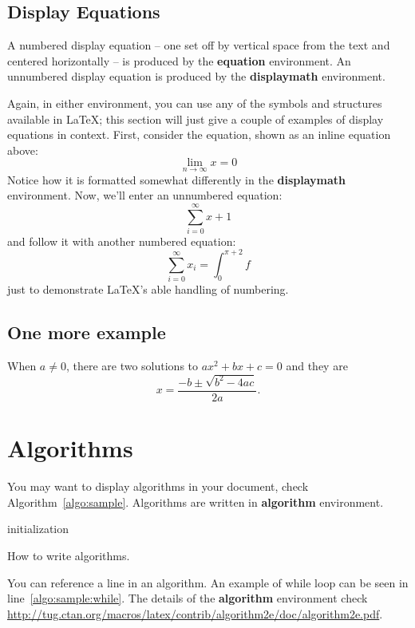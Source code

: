 \documentclass[article,slovene]{stucosrec}
\newcommand{\latex}{\LaTeX\xspace}
\begin{document}
	\subsection{Display Equations}
	A numbered display equation -- one set off by vertical space
	from the text and centered horizontally -- is produced
	by the \textbf{equation} environment. An unnumbered display
	equation is produced by the \textbf{displaymath} environment.
	
	Again, in either environment, you can use any of the symbols
	and structures available in \LaTeX; this section will just
	give a couple of examples of display equations in context.
	First, consider the equation, shown as an inline equation above:
	\begin{equation}\lim_{n\rightarrow \infty}x=0\end{equation}
	Notice how it is formatted somewhat differently in
	the \textbf{displaymath}
	environment.  Now, we'll enter an unnumbered equation:
	\begin{displaymath}\sum_{i=0}^{\infty} x + 1\end{displaymath}
	and follow it with another numbered equation:
	\begin{equation}\sum_{i=0}^{\infty}x_i=\int_{0}^{\pi+2} f\end{equation}
	just to demonstrate \LaTeX's able handling of numbering.
	
	\subsection{One more example}
	When $a \ne 0$, there are two solutions to $ax^2 + bx + c = 0$ and they are
	$$x = \frac{-b \pm \sqrt{b^2-4ac}}{2a}.$$
	
	\section{Algorithms}
	
	You may want to display algorithms in your document, check Algorithm~\ref{algo:sample}.
	Algorithms are written in \textbf{algorithm} environment.
	
	\begin{algorithm}
	
		\SetAlgoLined
		\KwResult{how to write algorithm with \latex}
		initialization\;
		\caption{How to write algorithms.}
		\label{algo:sample}
	\end{algorithm}

	You can reference a line in an algorithm.
	An example of while loop can be seen in line~\ref{algo:sample:while}.
	The details of the \textbf{algorithm} environment check \url{http://tug.ctan.org/macros/latex/contrib/algorithm2e/doc/algorithm2e.pdf}.
	
	
	
\end{document}

